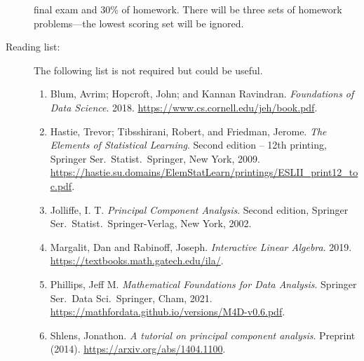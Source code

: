 \documentclass[a4paper, 12pt]{article}
\begin{document}
\begin{description}
    final exam and 30\% of homework. There will be three sets of homework
    problems---the lowest scoring set will be ignored. 
    \vspace{1cm}
    \item[Reading list:] The following list is not required but could be useful.
    \begin{enumerate} 
      \item Blum, Avrim; Hopcroft, John; and Kannan Ravindran.
      \textit{Foundations of Data Science}. 2018.
      \url{https://www.cs.cornell.edu/jeh/book.pdf}.
      \item Hastie, Trevor; Tibsshirani, Robert, and Friedman, Jerome. \textit{The Elements of Statistical Learning}. Second edition -- 12th printing, Springer Ser.\ Statist.\ Springer, New York, 2009. \url{https://hastie.su.domains/ElemStatLearn/printings/ESLII_print12_toc.pdf}.
      \item Jolliffe, I. T. \textit{Principal Component Analysis}. Second
      edition, Springer Ser.\ Statist.\ Springer-Verlag, New York, 2002.
      \item Margalit, Dan and Rabinoff, Joseph. \textit{Interactive Linear
      Algebra}. 2019. \url{https://textbooks.math.gatech.edu/ila/}.
      \item Phillips, Jeff M. \textit{Mathematical Foundations for Data Analysis}. Springer Ser.\ Data Sci.\ Springer, Cham, 2021. \url{https://mathfordata.github.io/versions/M4D-v0.6.pdf}.
      \item Shlens, Jonathon. \textit{A tutorial on principal component
      analysis}. Preprint (2014). \url{https://arxiv.org/abs/1404.1100}.
    \end{enumerate}
\end{description}
\end{document}
